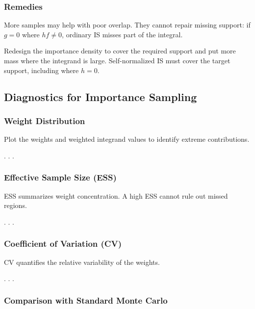 \documentclass[
  letterpaper,
  DIV=11,
  numbers=noendperiod]{scrartcl}
\begin{document}
\medskip\pause

\subsubsection{Remedies}\label{remedies}

More samples may help with poor overlap. They cannot repair missing
support: if \(g = 0\) where \(hf \neq 0\), ordinary IS misses part of
the integral.

\medskip\pause

Redesign the importance density to cover the required support and put
more mass where the integrand is large. Self-normalized IS must cover
the target support, including where \(h = 0\).

\subsection{Diagnostics for Importance
Sampling}\label{diagnostics-for-importance-sampling}

\subsubsection{Weight Distribution}\label{weight-distribution}

Plot the weights and weighted integrand values to identify extreme
contributions.

. . .

\subsubsection{Effective Sample Size
(ESS)}\label{effective-sample-size-ess}

ESS summarizes weight concentration. A high ESS cannot rule out missed
regions.

. . .

\subsubsection{Coefficient of Variation
(CV)}\label{coefficient-of-variation-cv}

CV quantifies the relative variability of the weights.

. . .

\subsubsection{Comparison with Standard Monte
Carlo}\label{comparison-with-standard-monte-carlo}
\end{document}
